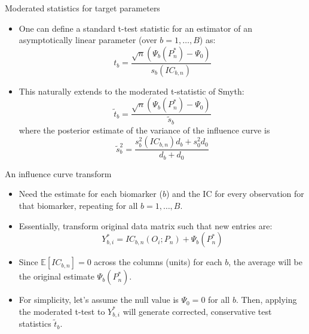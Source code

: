 \documentclass[12pt,t]{beamer}
\begin{document}
\begin{frame}[c]{Moderated statistics for target parameters}

\begin{center}
\begin{itemize}
  \itemsep12pt
  \item One can define a standard t-test statistic for an estimator of an
    asymptotically linear parameter (over $b = 1, \dots, B$) as:
    \[
      t_b = \frac{\sqrt{n}(\Psi_b(P_n^*) - \Psi_0)}{s_b(IC_{b,n})}
    \]
  \item This naturally extends to the moderated t-statistic of Smyth:
    \[
      \tilde{t}_b = \frac{\sqrt{n}(\Psi_b(P_n^*) - \Psi_0)}{\tilde{s}_b}
    \]
    where the posterior estimate of the variance of the influence curve is
    \[
      \tilde{s}^2_b = \frac{s^2_b(IC_{b,n})d_b + s^2_0d_0}{d_b + d_0}
    \]
\end{itemize}
\end{center}

\end{frame}



\begin{frame}[c]{An influence curve transform}

\begin{center}
\begin{itemize}
  \itemsep12pt
  \item Need the estimate for each biomarker ($b$) and the IC for every
    observation for that biomarker, repeating for all $b = 1, \dots, B$.
  \item Essentially, transform original data matrix such that new entries are:
    \[
      Y^*_{b,i} = IC_{b,n}(O_i; P_n) + \Psi_b(P_n^*)
     \]
 \item Since $\mathbb{E}[IC_{b,n}] = 0$ across the columns (units) for each $b$,
   the average will be the original estimate $\Psi_b(P_n^*)$.
  \item For simplicity, let's assume the null value is $\Psi_0 = 0$ for all $b$.
    Then, applying the moderated t-test to $Y^*_{b,i}$ will generate corrected,
    conservative test statistics $\tilde{t}_b$.
\end{itemize}
\end{center}

\end{frame}
\end{document}
